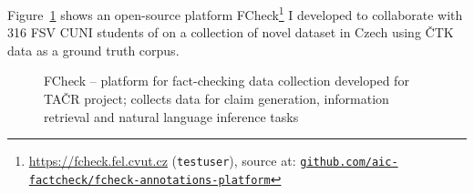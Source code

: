 Figure~\ref{fig:fcheck} shows an open-source platform FCheck\footnote{\url{https://fcheck.fel.cvut.cz} (\texttt{testuser}), source at: \href{https://github.com/aic-factcheck/fcheck-annotations-platform}{\texttt{github.com/aic-factcheck/fcheck-annotations-platform}}} I developed to collaborate with 316 FSV CUNI students of on a collection of novel dataset in Czech using ČTK data as a ground truth corpus.
\label{sec:datasets}
\begin{figure}[H]
    \caption{{\techbf FCheck} -- platform for fact-checking data collection developed for TAČR project; collects data for claim generation, information retrieval and natural language inference tasks}
    \label{fig:fcheck}
\end{figure}


